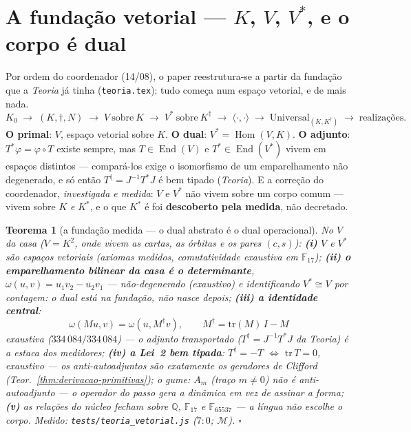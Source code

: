 \documentclass[11pt,a4paper]{article}
\newtheorem{teorema}{Teorema}
\newcommand{\code}[1]{\texttt{\small #1}}
\begin{document}
\section{A fundação vetorial --- $K$, $V$, $V^{*}$, e o corpo é
dual}\label{sec:fundacao}

Por ordem do coordenador (14/08), o paper reestrutura-se a partir da
fundação que a \emph{Teoria} já tinha (\code{teoria.tex}): tudo começa
num espaço vetorial, e de mais nada.
\[
\boxed{
K_{0}
\;\longrightarrow\;
(K,\dagger,N)
\;\longrightarrow\;
V\ \text{sobre}\ K
\;\longrightarrow\;
V^{*}\ \text{sobre}\ K^{\dagger}
\;\longrightarrow\;
\langle\cdot,\cdot\rangle
\;\longrightarrow\;
\mathrm{Universal}_{(K,K^{\dagger})}
\;\longrightarrow\;
\text{realizações}.
}
\]
\textbf{O primal}: $V$, espaço vetorial sobre $K$. \textbf{O dual}:
$V^{*}=\operatorname{Hom}(V,K)$. \textbf{O adjunto}:
$T^{*}\varphi=\varphi\circ T$ existe sempre, mas
$T\in\operatorname{End}(V)$ e $T^{*}\in\operatorname{End}(V^{*})$
vivem em espaços distintos --- compará-los exige o isomorfismo de um
emparelhamento não degenerado, e só então
$T^{\dagger}=J^{-1}T^{*}J$ é bem tipado (\emph{Teoria}). E a correção
do coordenador, \emph{investigada e medida}: $V$ e $V^{*}$ não vivem
sobre um corpo comum --- vivem sobre $K$ \emph{e} $K^{*}$, e o que
$K^{*}$ é foi \textbf{descoberto pela medida}, não decretado.

\begin{teorema}[a fundação medida --- o dual abstrato é o dual
operacional]\label{thm:fundacao}
No $V$ da casa ($V=K^{2}$, onde vivem as cartas, as órbitas e os
pares $(c,s)$): \textbf{(i)} $V$ e $V^{*}$ são espaços vetoriais
(axiomas medidos, comutatividade exaustiva em $\mathbb{F}_{17}$);
\textbf{(ii) o emparelhamento bilinear da casa é o determinante},
$\omega(u,v)=u_{1}v_{2}-u_{2}v_{1}$ --- não-degenerado (exaustivo) e
identificando $V^{*}\cong V$ por contagem: \emph{o dual está na
fundação, não nasce depois}; \textbf{(iii) a identidade central}:
\[
\boxed{\;\omega(Mu,v)=\omega(u,M^{\dagger}v),\qquad
M^{\dagger}=\mathrm{tr}(M)\,I-M\;}
\]
exaustiva ($334\,084/334\,084$) --- o adjunto transportado
($T^{\dagger}=J^{-1}T^{*}J$ da \emph{Teoria}) \emph{é} a estaca dos
medidores; \textbf{(iv) a Lei~2 bem tipada}: $T^{\dagger}=-T$
$\iff$ $\mathrm{tr}\,T=0$, exaustivo --- os anti-autoadjuntos são
\emph{exatamente} os geradores de Clifford
(Teor.~\ref{thm:derivacao-primitivas}); o gume: $A_{m}$ (traço
$m\neq0$) não é anti-autoadjunto --- o operador do passo \emph{gera} a dinâmica
em vez de assinar a forma; \textbf{(v)} as relações do núcleo fecham
sobre $\mathbb{Q}$, $\mathbb{F}_{17}$ e $\mathbb{F}_{65537}$ --- a
língua não escolhe o corpo.
\emph{Medido:} \code{tests/teoria\_vetorial.js} ($7{:}0$;
$\mathcal{M}$).
$\square$
\end{teorema}
\end{document}
